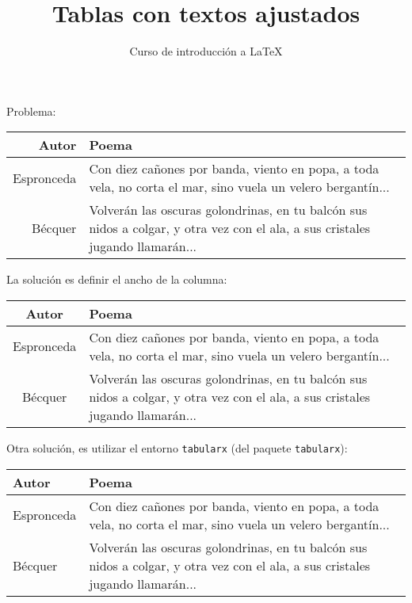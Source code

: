 \documentclass[10pt,letterpaper]{article}
\title{Tablas con textos ajustados}
\author{Curso de introducción a LaTeX}
\begin{document}
\maketitle

Problema:\\
\begin{tabular}{r l}
	\hline
	Autor & Poema \\
	\hline \hline
	Espronceda & Con diez cañones por banda, viento en popa, a toda vela, no corta el mar, sino vuela un velero bergantín... \\
	\hline
	Bécquer & Volverán las oscuras golondrinas, en tu balcón sus nidos a colgar, y otra vez con el ala, a sus cristales jugando llamarán... \\
	\hline
\end{tabular} %

\vspace{1cm}

La solución es definir el ancho de la columna:\\
\begin{tabular}{c p{5cm}}
\hline
Autor & Poema \\
	\hline \hline
	Espronceda & Con diez cañones por banda, viento en popa, a toda vela, no corta el mar, sino vuela un velero bergantín... \\
	\hline
	Bécquer & Volverán las oscuras golondrinas, en tu balcón sus nidos a colgar, y otra vez con el ala, a sus cristales jugando llamarán... \\
	\hline
\end{tabular}

\vspace{1cm}

Otra solución, es utilizar el entorno \texttt{tabularx} (del paquete \texttt{tabularx}): \\
\begin{tabularx}{\textwidth}{|l|X|}
\hline
Autor & Poema \\
	\hline \hline
	Espronceda & Con diez cañones por banda, viento en popa, a toda vela, no corta el mar, sino vuela un velero bergantín... \\
	\hline
	Bécquer & Volverán las oscuras golondrinas, en tu balcón sus nidos a colgar, y otra vez con el ala, a sus cristales jugando llamarán... \\
	\hline
\end{tabularx}\\
\end{document}
